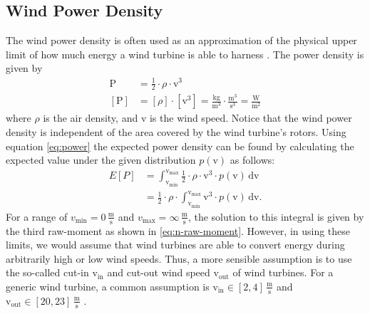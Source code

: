 \documentclass{article}
\theoremstyle{plain}
\theoremstyle{definition}
\theoremstyle{remark}
\begin{document}
\subsection{Wind Power Density}\label{sec:power-density}

The wind power density is often used as an approximation of the physical upper limit of how much energy a wind turbine is able to harness \cite{wang2021wind, mohammadi2016assessing, miao2020117382}. The power density is given by
\begin{align}\label{eq:power}
    \mathrm{P} &= \frac{1}{2} \cdot \rho \cdot \mathrm{v}^3 \\
    [\mathrm{P}] &= [\rho] \cdot [\mathrm{v}^3] = \frac{\mathrm{kg}}{\mathrm{m}^3} \cdot \frac{\mathrm{m}^3}{\mathrm{s}^3} = \frac{\mathrm{W}}{\mathrm{m}^2}
\end{align}
where $\rho$ is the air density, and $\mathrm{v}$ is the wind speed. Notice that the wind power density is independent of the area covered by the wind turbine's rotors. Using equation \eqref{eq:power} the expected power density can be found by calculating the expected value under the given distribution $p(\mathrm{v})$ as follows:
\begin{align}\label{eq:power-expectation}
    E[P] &= \int_{\mathrm{v}_\mathrm{min}}^{\mathrm{v}_\mathrm{max}} \frac{1}{2} \cdot \rho \cdot \mathrm{v}^3 \cdot p(\mathrm{v}) \, \mathrm{dv} \\
    &= \frac{1}{2} \cdot \rho \cdot \int_{\mathrm{v}_\mathrm{min}}^{\mathrm{v}_\mathrm{max}} \mathrm{v}^3 \cdot p(\mathrm{v}) \, \mathrm{dv}.
\end{align}
For a range of $v_\mathrm{min} = 0 \, \frac{\mathrm{m}}{\mathrm{s}}$ and $v_\mathrm{max} = \infty \, \frac{\mathrm{m}}{\mathrm{s}}$, the solution to this integral is given by the third raw-moment as shown in \eqref{eq:n-raw-moment}. However, in using these limits, we would assume that wind turbines are able to convert energy during arbitrarily high or low wind speeds. Thus,
a more sensible assumption is to use the so-called cut-in $\mathrm{v}_\mathrm{in}$ and cut-out wind speed $\mathrm{v}_\mathrm{out}$ of wind turbines. For a generic wind turbine, a common assumption is $\mathrm{v}_\mathrm{in} \in [2, 4] \, \frac{\mathrm{m}}{\mathrm{s}}$ and $\mathrm{v}_\mathrm{out} \in [20, 23] \, \frac{\mathrm{m}}{\mathrm{s}}$ \cite{dupont2017, wang2021wind}.
\end{document}
